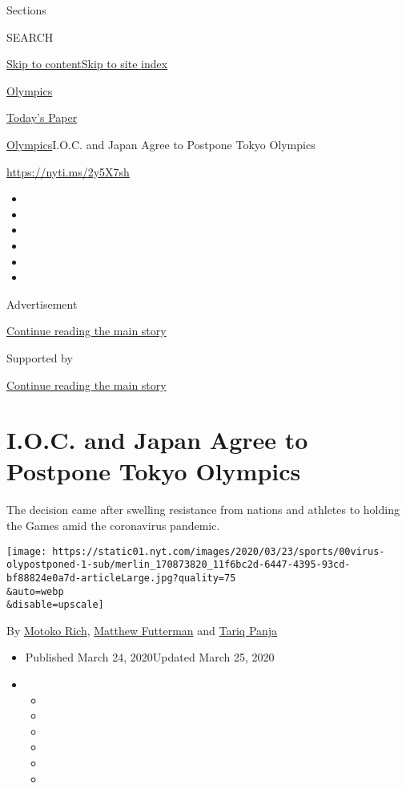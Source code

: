 Sections

SEARCH

\protect\hyperlink{site-content}{Skip to
content}\protect\hyperlink{site-index}{Skip to site index}

\href{https://www.nytimes.com/section/sports/olympics}{Olympics}

\href{https://myaccount.nytimes.com/auth/login?response_type=cookie\&client_id=vi}{}

\href{https://www.nytimes.com/section/todayspaper}{Today's Paper}

\href{/section/sports/olympics}{Olympics}\textbar{}I.O.C. and Japan
Agree to Postpone Tokyo Olympics

\url{https://nyti.ms/2y5X7sh}

\begin{itemize}
\item
\item
\item
\item
\item
\item
\end{itemize}

Advertisement

\protect\hyperlink{after-top}{Continue reading the main story}

Supported by

\protect\hyperlink{after-sponsor}{Continue reading the main story}

\hypertarget{ioc-and-japan-agree-to-postpone-tokyo-olympics}{%
\section{I.O.C. and Japan Agree to Postpone Tokyo
Olympics}\label{ioc-and-japan-agree-to-postpone-tokyo-olympics}}

The decision came after swelling resistance from nations and athletes to
holding the Games amid the coronavirus pandemic.

\texttt{[image: https://static01.nyt.com/images/2020/03/23/sports/00virus-olypostponed-1-sub/merlin\_170873820\_11f6bc2d-6447-4395-93cd-bf88824e0a7d-articleLarge.jpg?quality=75\\\&auto=webp\\\&disable=upscale]}

By \href{https://www.nytimes.com/by/motoko-rich}{Motoko Rich},
\href{https://www.nytimes.com/by/matthew-futterman}{Matthew Futterman}
and \href{https://www.nytimes.com/by/tariq-panja}{Tariq Panja}

\begin{itemize}
\item
  Published March 24, 2020Updated March 25, 2020
\item
  \begin{itemize}
  \item
  \item
  \item
  \item
  \item
  \item
  \end{itemize}
\end{itemize}

